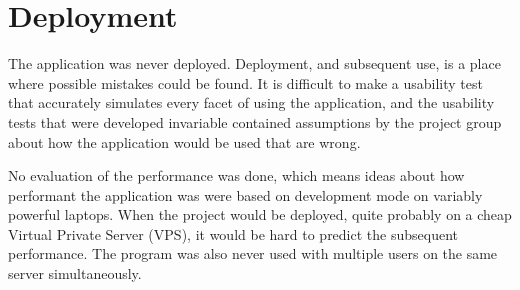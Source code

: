 \section{Deployment}
The application was never deployed.
Deployment, and subsequent use, is a place where possible mistakes could be found.
It is difficult to make a usability test that accurately simulates every facet of using the application, and the usability tests that were developed invariable contained assumptions by the project group about how the application would be used that are wrong.

No evaluation of the performance was done, which means ideas about how performant the application was were based on development mode on variably powerful laptops.
When the project would be deployed, quite probably on a cheap Virtual Private Server (VPS), it would be hard to predict the subsequent performance.
The program was also never used with multiple users on the same server simultaneously.
